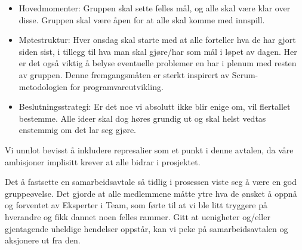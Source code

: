 \begin{itemize}
	\item Hovedmomenter: Gruppen skal sette felles mål, og alle skal være klar over disse. Gruppen skal være åpen for at alle skal komme med innspill.
	\item Møtestruktur: Hver onsdag skal starte med at alle forteller hva de har gjort siden sist, i tillegg til hva man skal gjøre/har som mål i løpet av dagen. Her er det også viktig å belyse eventuelle problemer en har i plenum med resten av gruppen. Denne fremgangsmåten er sterkt inspirert av Scrum-metodologien\cite{Scrum} for programvareutvikling.
	\item Beslutningsstrategi: Er det noe vi absolutt ikke blir enige om, vil flertallet bestemme. Alle ideer skal dog høres grundig ut og skal helst vedtas enstemmig om det lar seg gjøre.
\end{itemize}

Vi unnlot bevisst å inkludere represalier som et punkt i denne avtalen, da våre ambisjoner implisitt krever at alle bidrar i prosjektet.

Det å fastsette en samarbeidsavtale så tidlig i prosessen viste seg å
være en god gruppeøvelse. Det gjorde at alle medlemmene måtte ytre hva
de ønsket å oppnå og forventet av Eksperter i Team, som førte til at
vi ble litt tryggere på hverandre og fikk dannet noen felles
rammer. Gitt at uenigheter og/eller gjentagende uheldige hendelser
oppstår, kan vi peke på samarbeidsavtalen og aksjonere ut fra den.



